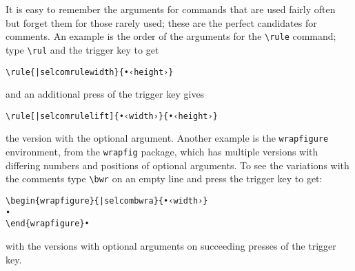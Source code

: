 \documentclass[11pt]{article}
\begin{document}
It is easy to remember the arguments for commands that are used fairly often but forget them for those rarely used; these are the perfect candidates for comments. An example is the order of the arguments for the \verb|\rule| command; type \verb|\rul| and the trigger key to get
\begin{verbatim}
\rule{|selcomrulewidth}{•‹height›}
\end{verbatim}
and an additional press of the trigger key gives
\begin{verbatim}
\rule[|selcomrulelift]{•‹width›}{•‹height›}
\end{verbatim}
the version with the optional argument. Another example is the \texttt{wrapfigure} environment, from the \texttt{wrapfig} package, which has multiple versions with differing numbers and positions of optional arguments. To see the variations with the comments type \verb|\bwr| on an empty line and press the trigger key to get:
\begin{verbatim}
\begin{wrapfigure}{|selcombwra}{•‹width›}
•
\end{wrapfigure}•
\end{verbatim}
with the versions with optional arguments on succeeding presses of the trigger key.
\end{document}

